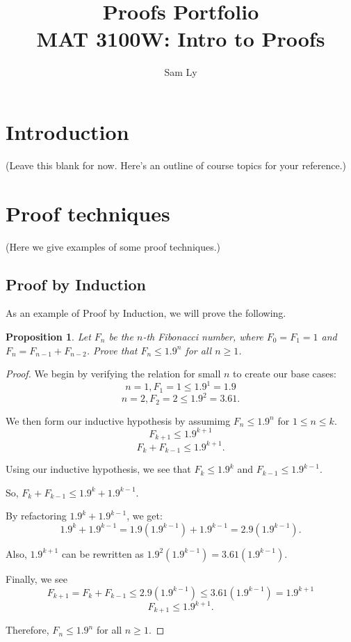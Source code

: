 \documentclass{article}
\title{Proofs Portfolio\\[5pt] \large MAT 3100W: Intro to Proofs}
\author{Sam Ly}
\newtheorem{proposition}{Proposition}
\theoremstyle{definition}
\begin{document}
\maketitle

\section{Introduction}
(Leave this blank for now. Here's an outline of course topics for your reference.)

\section{Proof techniques}
(Here we give examples of some proof techniques.)

\subsection{Proof by Induction}
As an example of Proof by Induction, we will prove the following.

\begin{proposition}
    Let \(F_n\) be the \(n\)-th Fibonacci number, where \(F_0 = F_1 = 1\)
    and \(F_n = F_{n-1} + F_{n-2}\). Prove that \(F_n \le 1.9^n\) for all
    \(n \ge 1\).
\end{proposition}
\begin{proof}
    We begin by verifying the relation for small \(n\) to create our 
    base cases:
    \[n = 1, F_1 = 1 \le 1.9^1 = 1.9\]
    \[n = 2, F_2 = 2 \le 1.9^2 = 3.61.\]

    We then form our inductive hypothesis by assumimg \(F_n \le 1.9^n\) for \(1 \le n \le k\).
    \[F_{k+1} \le 1.9^{k+1}\]
    \[F_k + F_{k-1} \le 1.9^{k+1}.\]

    Using our inductive hypothesis, we see that \(F_k \le 1.9^k\)
    and \(F_{k-1} \le 1.9^{k-1}\).

    So, \(F_k + F_{k-1} \le 1.9^k + 1.9^{k-1}\).

    By refactoring \(1.9^k + 1.9^{k-1}\), we get:
    \[1.9^k + 1.9^{k-1} = 1.9(1.9^{k-1}) + 1.9^{k-1} = 2.9(1.9^{k-1}).\]

    Also, \(1.9^{k+1}\) can be rewritten as \(1.9^2 (1.9^{k-1}) = 3.61(1.9^{k-1})\).

    Finally, we see
    \[F_{k+1} = F_k + F_{k-1} \le 2.9(1.9^{k-1}) \le 3.61(1.9^{k-1}) = 1.9^{k+1}\]
    \[F_{k+1} \le 1.9^{k+1}.\]

    Therefore, \(F_n \le 1.9^n\) for all \(n \ge 1\).
\end{proof}
\end{document}
